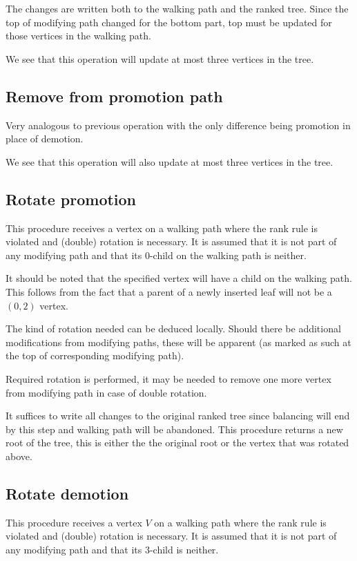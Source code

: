 The changes are written both to the walking path and the ranked tree. Since the top of modifying path changed for the bottom part, top must be updated for those vertices in the walking path.

We see that this operation will update at most three vertices in the tree.

\subsection{Remove from promotion path}

Very analogous to previous operation with the only difference being promotion in place of demotion.

We see that this operation will also update at most three vertices in the tree.

\subsection{Rotate promotion}

This procedure receives a vertex on a walking path where the rank rule is violated and (double) rotation is necessary. It is assumed that it is not part of any modifying path and that its $0$-child on the walking path is neither. 

It should be noted that the specified vertex will have a child on the walking path. This follows from the fact that a parent of a newly inserted leaf will not be a $(0,2)$ vertex.

The kind of rotation needed can be deduced locally. Should there be additional modifications from modifying paths, these will be apparent (as marked as such at the top of corresponding modifying path). 

Required rotation is performed, it may be needed to remove one more vertex from modifying path in case of double rotation.

It suffices to write all changes to the original ranked tree since balancing will end by this step and walking path will be abandoned. 
This procedure returns a new root of the tree, this is either the the original root or the vertex that was rotated above.

\subsection{Rotate demotion}

This procedure receives a vertex $V$ on a walking path where the rank rule is violated and (double) rotation is necessary. It is assumed that it is not part of any modifying path and that its $3$-child is neither. 

